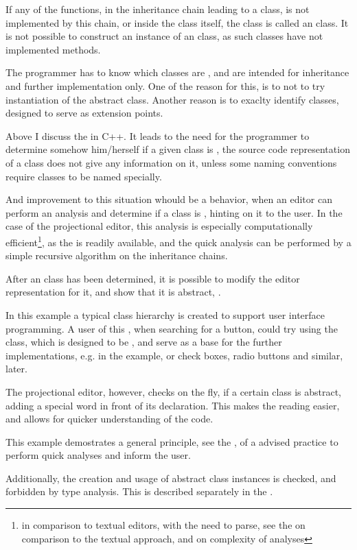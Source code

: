 If any of the  functions, in the inheritance chain leading to a class, is not implemented by this chain, 
or inside the class itself, the class is called an  class. It is not possible to construct an instance of an
 class, as such classes have not implemented methods.

The programmer has to know which classes are ,
and are intended for inheritance and further implementation only. One of the reason for this, is to not to try instantiation of
the abstract class. Another reason is to exaclty identify  classes, designed to serve as extension points.

Above I discuss the  in C++. It leads to the need for the programmer to determine somehow him/herself 
if a given class is , the source code representation of a class does not give any information on it, 
unless some naming conventions require  classes to be named specially.

And improvement to this situation whould be a behavior, when an editor can perform an analysis and 
determine if a class is , hinting on it to the user. In the case of the projectional
editor, this analysis is especially computationally efficient\footnote{in comparison to textual editors, with the need to 
parse, see the  on comparison to the textual approach, and  on complexity of analyses}, 
as the  is readily available, and the quick  analysis can be performed by a simple recursive algorithm on the inheritance chains.

After an  class has been determined, it is possible to modify the editor representation for it, 
and show that it is abstract, .

In this example a typical class hierarchy is created to support user interface programming. A user of this , when 
searching for a button, could try using the  class, which is designed to be , and serve as a 
base for the further implementations, e.g.  in the example, or check boxes, radio buttons and similar,
later.


The projectional editor, however, checks on the fly, if a certain class is abstract, adding a special  word 
in front of its declaration. This makes the reading easier, and allows for quicker understanding of the code. 

This example demostrates a general principle, see  the , of a advised practice to 
perform quick analyses and inform the user.

Additionally, the creation and usage of abstract class instances is checked, and forbidden by type analysis. This is 
described separately in the .
